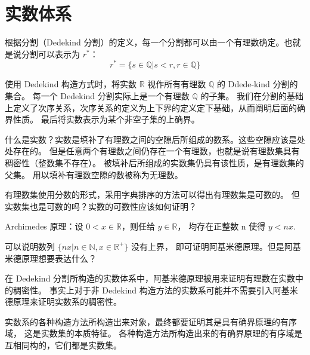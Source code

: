 
\section{实数体系}

\begin{exposition}
根据分割（Dedekind 分割）的定义，每一个分割都可以由一个有理数确定。也就是说分割可以表示为 $r^*$：
\[
     r^* = \{s \in \mathbb{Q} | s < r, r \in \mathbb{Q}\}
\]
\end{exposition}

\begin{exposition}
    使用 Dedekind 构造方式时，将实数 $\mathbb{R}$ 视作所有有理数 $\mathbb{Q}$ 的 Ddede-kind 分割的集合。
    每一个 Dedekind 分割实际上是一个有理数 $\mathbb{Q}$ 的子集。
    我们在分割的基础上定义了次序关系，次序关系的定义为上下界的定义定下基础，从而阐明后面的确界性质。
    最后将实数表示为某个非空子集的上确界。
\end{exposition}

\begin{exposition}
    什么是实数？实数是填补了有理数之间的空隙后所组成的数系。这些空隙应该是处处存在的。
    但是任意两个有理数之间仍存在一个有理数，也就是说有理数集具有稠密性（整数集不存在）。
    被填补后所组成的实数集仍具有该性质，是有理数集的父集。
    用以填补有理数空隙的数被称为无理数。
\end{exposition}

\begin{exposition}
    有理数集使用分数的形式，采用字典排序的方法可以得出有理数集是可数的。
    但实数集也是可数的吗？实数的可数性应该如何证明？
\end{exposition}

\begin{exposition}
    Archimedes 原理：设 $0 < x \in \mathbb{R}$，则任给 $y \in \mathbb{R}$，
    均存在正整数 n 使得 $y < nx$.

    可以说明数列 $\{nx | n \in \mathbb{N}, x \in \mathbb{R}^{+}\}$ 没有上界，
    即可证明阿基米德原理。但是阿基米德原理想要表达什么？

    在 Dedekind 分割所构造的实数体系中，阿基米德原理被用来证明有理数在实数中的稠密性。
    事实上对于非 Dedekind 构造方法的实数系可能并不需要引入阿基米德原理来证明实数系的稠密性。
\end{exposition}

\begin{exposition}
    实数系的各种构造方法所构造出来对象，最终都要证明其是具有确界原理的有序域，
    这是实数集的本质特征。
    各种构造方法所构造出来的有确界原理的有序域是互相同构的，它们都是实数集。
\end{exposition}

